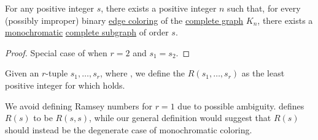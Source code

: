 \begin{corollary}\label{thm:ramseys_theorem_single}
  For any positive integer \( s \), there exists a positive integer \( n \) such that, for every (possibly improper) binary \hyperref[def:graph_coloring]{edge coloring} of the \hyperref[def:complete_graph]{complete graph} \( K_n \), there exists a \hyperref[def:set_coloring/monochromatic]{monochromatic} \hyperref[def:complete_subgraph]{complete subgraph} of order \( s \).
\end{corollary}
\begin{proof}
  Special case of  when \( r = 2 \) and \( s_1 = s_2 \).
\end{proof}

\begin{definition}\label{def:ramsey_number}
  Given an \( r \)-tuple \( s_1, \ldots, s_r \), where , we define the  \( R(s_1, \ldots, s_r) \) as the least positive integer for which  holds.
\end{definition}
\begin{comments}
  \item We avoid defining Ramsey numbers for \( r = 1 \) due to possible ambiguity.  defines \( R(s) \) to be \( R(s, s) \), while our general definition would suggest that \( R(s) \) should instead be the degenerate case of monochromatic coloring.
\end{comments}

